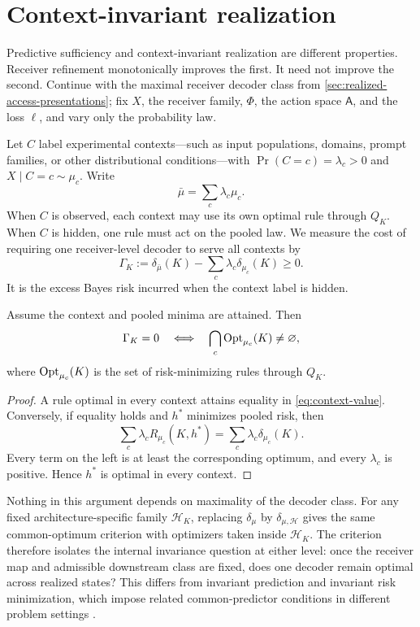 \section{Context-invariant realization}
\label{sec:contextuality}

Predictive sufficiency and context-invariant realization are different properties. Receiver refinement monotonically improves the first. It need not improve the second. Continue with the maximal receiver decoder class from \cref{sec:realized-access-presentations}; fix $X$, the receiver family, $\Phi$, the action space $\mathsf A$, and the loss $\ell$, and vary only the probability law.

Let $C$ label experimental contexts---such as input populations, domains, prompt families, or other distributional conditions---with $\Pr(C=c)=\lambda_c>0$ and $X\mid C=c\sim\mu_c$. Write
\[
\bar\mu=\sum_c\lambda_c\mu_c.
\]
When $C$ is observed, each context may use its own optimal rule through $Q_K$. When $C$ is hidden, one rule must act on the pooled law. We measure the cost of requiring one receiver-level decoder to serve all contexts by
\begin{equation}
\Gamma_K
:=
\delta_{\bar\mu}(K)-\sum_c\lambda_c\delta_{\mu_c}(K)
\ge0.
\label{eq:context-value}
\end{equation}
It is the excess Bayes risk incurred when the context label is hidden.

\begin{proposition}
\label{thm:shared-decoder-criterion}
Assume the context and pooled minima are attained. Then
\[
\Gamma_K=0
\quad\Longleftrightarrow\quad
\bigcap_c\operatorname{Opt}_{\mu_c}(K)\neq\varnothing,
\]
where $\operatorname{Opt}_{\mu_c}(K)$ is the set of risk-minimizing rules through $Q_K$.
\end{proposition}
\begin{proof}
A rule optimal in every context attains equality in \cref{eq:context-value}. Conversely, if equality holds and $h^*$ minimizes pooled risk, then
\[
\sum_c\lambda_c R_{\mu_c}(K,h^*)
=
\sum_c\lambda_c\delta_{\mu_c}(K).
\]
Every term on the left is at least the corresponding optimum, and every $\lambda_c$ is positive. Hence $h^*$ is optimal in every context.
\end{proof}

Nothing in this argument depends on maximality of the decoder class. For any fixed architecture-specific family $\mathscr H_K$, replacing $\delta_\mu$ by $\delta_{\mu,\mathscr H}$ gives the same common-optimum criterion with optimizers taken inside $\mathscr H_K$. The criterion therefore isolates the internal invariance question at either level: once the receiver map and admissible downstream class are fixed, does one decoder remain optimal across realized states? This differs from invariant prediction and invariant risk minimization, which impose related common-predictor conditions in different problem settings \citep{arjovsky2019irm,ruan2022covariate}.

